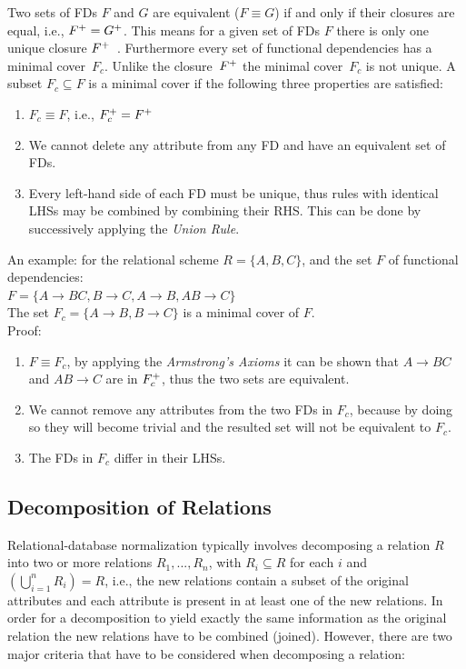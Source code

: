 Two sets of FDs $F$ and $G$ are equivalent ($F \equiv G$)
if and only if their closures are equal, i.e., $F\sp{+} = G\sp{+}$. 
This means for a given set of FDs $F$ there is 
only one unique closure $F\sp{+}$~\cite[Section 6.3.1]{bdb2}. Furthermore every set of functional dependencies 
has a minimal cover~$F_c$. Unlike the closure~$F\sp{+}$ the minimal cover~$F_c$ is not unique. 
A subset $F_c \subseteq F$ is a minimal cover if the following three
properties are satisfied:

\begin{enumerate}
  \item $F_c \equiv F$, i.e., $F\sb{c}\sp{+} = F\sp{+}$
  \item We cannot delete any attribute from any FD and have an equivalent set of FDs.
  \item Every left-hand side of each FD must be unique, thus
    rules with identical LHSs may be combined by combining their RHS.
    This can be done by successively applying the \textit{Union Rule}.
\end{enumerate}

An example: for the relational scheme $R = \{A, B, C\}$, and the set $F$ of functional dependencies: \\

$ F = \{A \rightarrow BC, B \rightarrow C, A \rightarrow B, AB \rightarrow C\}$ \\
\indent The set $F_c = \{A \rightarrow B, B \rightarrow C\}$ is a minimal cover of $F$. \\
\indent Proof:
\indent \begin{enumerate}
  \item $F \equiv F_c $, by applying the \textit{Armstrong's Axioms} it can be shown that $A \rightarrow BC$ and $AB \rightarrow C$ are in $F\sb{c}\sp{+}$, thus the two sets are equivalent.
  \item We cannot remove any attributes from the two FDs in $F_c$, because by doing so they will become trivial and the resulted set will not be equivalent to $F_c$.
  \item The FDs in $F_c$ differ in their LHSs. 
\end{enumerate}

\subsection{Decomposition of Relations}
\label{sec:decofrel}
Relational-database normalization typically involves decomposing a relation $R$
into two or more relations $R_1,...,R_n$, with $R_i \subseteq R$ for each $i$ 
and $(\bigcup_{i=1}^{n} R_i) = R$, i.e., the 
new relations contain a subset of the original attributes and each attribute is present in at least one
of the new relations. 
In order for a decomposition to yield
exactly the same information as the original relation the new relations have to be
combined (joined). However, there are two major criteria that have to be considered when
decomposing a relation:


